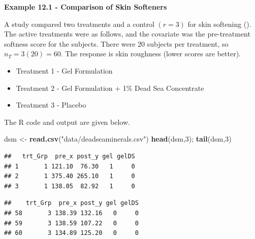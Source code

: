 \documentclass[
]{book}
\newenvironment{Shaded}{\begin{snugshade}}{\end{snugshade}}
\newcommand{\DecValTok}[1]{\textcolor[rgb]{0.00,0.00,0.81}{#1}}
\newcommand{\FunctionTok}[1]{\textcolor[rgb]{0.13,0.29,0.53}{\textbf{#1}}}
\newcommand{\NormalTok}[1]{#1}
\newcommand{\OtherTok}[1]{\textcolor[rgb]{0.56,0.35,0.01}{#1}}
\newcommand{\StringTok}[1]{\textcolor[rgb]{0.31,0.60,0.02}{#1}}
\providecommand{\tightlist}{%
  \setlength{\itemsep}{0pt}\setlength{\parskip}{0pt}}
\begin{document}
\textbf{Example 12.1 - Comparison of Skin Softeners}

A study compared two treatments and a control \((r=3)\) for skin
softening (). The
active treatments were as follows, and the covariate was the
pre-treatment softness score for the subjects. There were 20 subjects
per treatment, so \(n_T=3(20)=60\). The response is skin roughness
(lower scores are better).

\begin{itemize}
\tightlist
\item
  Treatment 1 - Gel Formulation
\item
  Treatment 2 - Gel Formulation + 1\% Dead Sea Concentrate
\item
  Treatment 3 - Placebo
\end{itemize}

The R code and output are given below.

\begin{Shaded}
\begin{Highlighting}[]
\NormalTok{dsm }\OtherTok{\textless{}{-}} \FunctionTok{read.csv}\NormalTok{(}\StringTok{"data/deadseaminerals.csv"}\NormalTok{)}
\FunctionTok{head}\NormalTok{(dsm,}\DecValTok{3}\NormalTok{); }\FunctionTok{tail}\NormalTok{(dsm,}\DecValTok{3}\NormalTok{)}
\end{Highlighting}
\end{Shaded}

\begin{verbatim}
##   trt_Grp  pre_x post_y gel gelDS
## 1       1 121.10  76.30   1     0
## 2       1 375.40 265.10   1     0
## 3       1 138.05  82.92   1     0
\end{verbatim}

\begin{verbatim}
##    trt_Grp  pre_x post_y gel gelDS
## 58       3 138.39 132.16   0     0
## 59       3 138.59 107.22   0     0
## 60       3 134.89 125.20   0     0
\end{verbatim}
\end{document}
